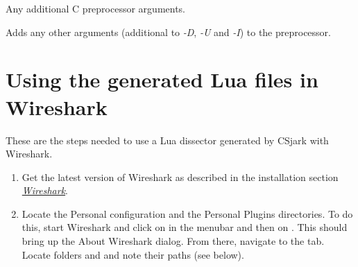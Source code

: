 \documentclass[A4paper,10pt,english]{sphinxmanual}
\begin{document}
\begin{fulllineitems}
\label{user/use:cmdoption-A}
Any additional C preprocessor arguments.

Adds any other arguments (additional to \emph{-D}, \emph{-U} and \emph{-I}) to the preprocessor.

\end{fulllineitems}



\section{Using the generated Lua files in Wireshark}
\label{user/use_ws:using-the-generated-lua-files-in-wireshark}\label{user/use_ws::doc}
These are the steps needed to use a Lua dissector generated by CSjark with Wireshark.
\begin{enumerate}
\item {} 
Get the latest version of Wireshark as described in the installation section {\hyperref[user/install:ws]{\emph{Wireshark}}}.

\item {} 
Locate the Personal configuration and the Personal Plugins directories. To do this, start Wireshark and click on  in the menubar and then on . This should bring up the About Wireshark dialog. From there, navigate to the  tab. Locate folders  and  and note their paths (see below).

\end{enumerate}
\end{document}
